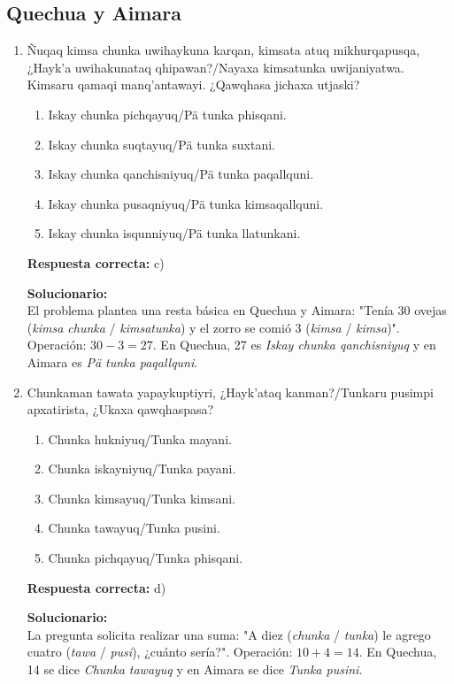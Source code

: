\subsection*{Quechua y Aimara}

\begin{enumerate}
	
	\item Ñuqaq kimsa chunka uwihaykuna karqan, kimsata atuq mikhurqapusqa, ¿Hayk'a uwihakunataq qhipawan?/Nayaxa kimsatunka uwijaniyatwa. Kimsaru qamaqi manq'antawayi. ¿Qawqhasa jichaxa utjaski?
	
	\begin{enumerate}[label=\alph*)]
		\item Iskay chunka pichqayuq/Pä tunka phisqani.
		\item Iskay chunka suqtayuq/Pä tunka suxtani.
		\item Iskay chunka qanchisniyuq/Pä tunka paqallquni.
		\item Iskay chunka pusaqniyuq/Pä tunka kimsaqallquni.
		\item Iskay chunka isqunniyuq/Pä tunka llatunkani.
	\end{enumerate}
	
	\textbf{Respuesta correcta:} c)
	
	\vspace{2mm}
	\textbf{Solucionario:}\\
	El problema plantea una resta básica en Quechua y Aimara: "Tenía 30 ovejas (\textit{kimsa chunka} / \textit{kimsatunka}) y el zorro se comió 3 (\textit{kimsa} / \textit{kimsa})". 
	Operación: $30 - 3 = 27$.
	En Quechua, 27 es \textit{Iskay chunka qanchisniyuq} y en Aimara es \textit{Pä tunka paqallquni}.
	
	\vspace{6mm}
	
	\item Chunkaman tawata yapaykuptiyri, ¿Hayk'ataq kanman?/Tunkaru pusimpi apxatirista, ¿Ukaxa qawqhaspasa?
	
	\begin{enumerate}[label=\alph*)]
		\item Chunka hukniyuq/Tunka mayani.
		\item Chunka iskayniyuq/Tunka payani.
		\item Chunka kimsayuq/Tunka kimsani.
		\item Chunka tawayuq/Tunka pusini.
		\item Chunka pichqayuq/Tunka phisqani.
	\end{enumerate}
	
	\textbf{Respuesta correcta:} d)
	
	\vspace{2mm}
	\textbf{Solucionario:}\\
	La pregunta solicita realizar una suma: "A diez (\textit{chunka} / \textit{tunka}) le agrego cuatro (\textit{tawa} / \textit{pusi}), ¿cuánto sería?".
	Operación: $10 + 4 = 14$.
	En Quechua, 14 se dice \textit{Chunka tawayuq} y en Aimara se dice \textit{Tunka pusini}.
	
	\vspace{6mm}
	
\end{enumerate}

